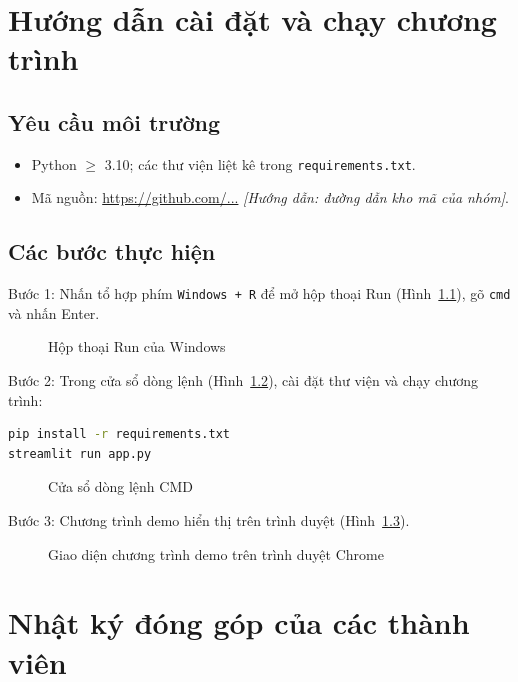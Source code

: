 \documentclass[12pt,a4paper,oneside]{report}
\newcommand{\huongdan}[1]{{\color{guide}\itshape [Hướng dẫn: #1]}}
\begin{document}
\chapter{Hướng dẫn cài đặt và chạy chương trình}
\label{pl:huongdan}

\section{Yêu cầu môi trường}
\begin{itemize}
  \item Python $\geq$ 3.10; các thư viện liệt kê trong \texttt{requirements.txt}.
  \item Mã nguồn: \url{https://github.com/...} \huongdan{đường dẫn kho mã của nhóm}.
\end{itemize}

\section{Các bước thực hiện}
Bước 1: Nhấn tổ hợp phím \texttt{Windows + R} để mở hộp thoại Run
(Hình~\ref{fig:run}), gõ \texttt{cmd} và nhấn Enter.

\begin{figure}[H]
  \centering
  \caption{Hộp thoại Run của Windows}
  \label{fig:run}
\end{figure}

Bước 2: Trong cửa sổ dòng lệnh (Hình~\ref{fig:cmd}), cài đặt thư viện và
chạy chương trình:

\begin{lstlisting}[language=bash,numbers=none]
pip install -r requirements.txt
streamlit run app.py
\end{lstlisting}

\begin{figure}[H]
  \centering
  \caption{Cửa sổ dòng lệnh CMD}
  \label{fig:cmd}
\end{figure}

Bước 3: Chương trình demo hiển thị trên trình duyệt (Hình~\ref{fig:chrome}).

\begin{figure}[H]
  \centering
  \caption{Giao diện chương trình demo trên trình duyệt Chrome}
  \label{fig:chrome}
\end{figure}

\chapter{Nhật ký đóng góp của các thành viên}
\label{pl:nhatky}
\end{document}

